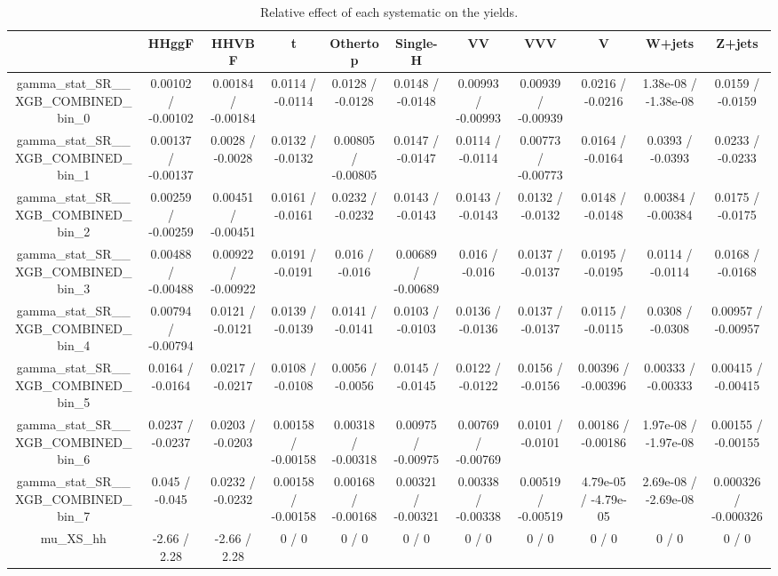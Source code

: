 \documentclass[10pt]{article}
\begin{document}
\begin{table}[htbp]
\begin{center}
\begin{tabular}{|c|c|c|c|c|c|c|c|c|c|c|}
\hline 
      & HHggF      & HHVBF      & t      & Othertop      & Single-H      & VV      & VVV      & V      & W+jets      & Z+jets \\ 
\hline 
  gamma_stat_SR__XGB_COMBINED_bin_0 & 0.00102 / -0.00102 & 0.00184 / -0.00184 & 0.0114 / -0.0114 & 0.0128 / -0.0128 & 0.0148 / -0.0148 & 0.00993 / -0.00993 & 0.00939 / -0.00939 & 0.0216 / -0.0216 & 1.38e-08 / -1.38e-08 & 0.0159 / -0.0159 \\ 
  gamma_stat_SR__XGB_COMBINED_bin_1 & 0.00137 / -0.00137 & 0.0028 / -0.0028 & 0.0132 / -0.0132 & 0.00805 / -0.00805 & 0.0147 / -0.0147 & 0.0114 / -0.0114 & 0.00773 / -0.00773 & 0.0164 / -0.0164 & 0.0393 / -0.0393 & 0.0233 / -0.0233 \\ 
  gamma_stat_SR__XGB_COMBINED_bin_2 & 0.00259 / -0.00259 & 0.00451 / -0.00451 & 0.0161 / -0.0161 & 0.0232 / -0.0232 & 0.0143 / -0.0143 & 0.0143 / -0.0143 & 0.0132 / -0.0132 & 0.0148 / -0.0148 & 0.00384 / -0.00384 & 0.0175 / -0.0175 \\ 
  gamma_stat_SR__XGB_COMBINED_bin_3 & 0.00488 / -0.00488 & 0.00922 / -0.00922 & 0.0191 / -0.0191 & 0.016 / -0.016 & 0.00689 / -0.00689 & 0.016 / -0.016 & 0.0137 / -0.0137 & 0.0195 / -0.0195 & 0.0114 / -0.0114 & 0.0168 / -0.0168 \\ 
  gamma_stat_SR__XGB_COMBINED_bin_4 & 0.00794 / -0.00794 & 0.0121 / -0.0121 & 0.0139 / -0.0139 & 0.0141 / -0.0141 & 0.0103 / -0.0103 & 0.0136 / -0.0136 & 0.0137 / -0.0137 & 0.0115 / -0.0115 & 0.0308 / -0.0308 & 0.00957 / -0.00957 \\ 
  gamma_stat_SR__XGB_COMBINED_bin_5 & 0.0164 / -0.0164 & 0.0217 / -0.0217 & 0.0108 / -0.0108 & 0.0056 / -0.0056 & 0.0145 / -0.0145 & 0.0122 / -0.0122 & 0.0156 / -0.0156 & 0.00396 / -0.00396 & 0.00333 / -0.00333 & 0.00415 / -0.00415 \\ 
  gamma_stat_SR__XGB_COMBINED_bin_6 & 0.0237 / -0.0237 & 0.0203 / -0.0203 & 0.00158 / -0.00158 & 0.00318 / -0.00318 & 0.00975 / -0.00975 & 0.00769 / -0.00769 & 0.0101 / -0.0101 & 0.00186 / -0.00186 & 1.97e-08 / -1.97e-08 & 0.00155 / -0.00155 \\ 
  gamma_stat_SR__XGB_COMBINED_bin_7 & 0.045 / -0.045 & 0.0232 / -0.0232 & 0.00158 / -0.00158 & 0.00168 / -0.00168 & 0.00321 / -0.00321 & 0.00338 / -0.00338 & 0.00519 / -0.00519 & 4.79e-05 / -4.79e-05 & 2.69e-08 / -2.69e-08 & 0.000326 / -0.000326 \\ 
  mu_XS_hh & -2.66 / 2.28 & -2.66 / 2.28 & 0 / 0 & 0 / 0 & 0 / 0 & 0 / 0 & 0 / 0 & 0 / 0 & 0 / 0 & 0 / 0 \\ 
\hline 
\end{tabular} 
\caption{Relative effect of each systematic on the yields.} 
\end{center} 
\end{table} 
\end{document}
